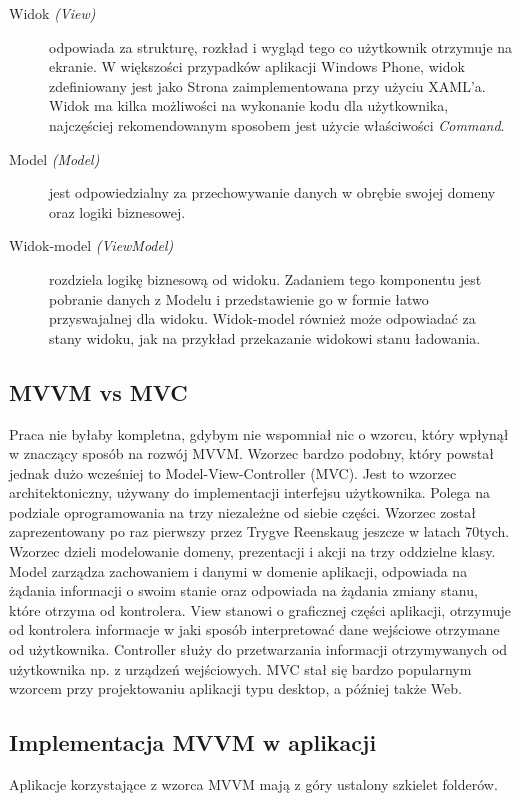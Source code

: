 \documentclass[a4paper,twoside,titlepage,openright]{book}
\begin{document}
\begin{description}

	\item[Widok \textit{(View)}] odpowiada za strukturę, rozkład i wygląd tego co użytkownik otrzymuje na ekranie. W większości przypadków aplikacji Windows Phone, widok zdefiniowany jest jako Strona zaimplementowana przy użyciu XAML’a. Widok ma kilka możliwości na wykonanie kodu dla użytkownika, najczęściej rekomendowanym sposobem jest użycie właściwości \textit{Command}.
	
	\item[Model \textit{(Model)}] jest odpowiedzialny za przechowywanie danych w obrębie swojej domeny oraz logiki biznesowej.
	
	\item[Widok-model \textit{(ViewModel)}] rozdziela logikę biznesową od widoku. Zadaniem tego komponentu jest pobranie danych z Modelu i przedstawienie go w formie łatwo przyswajalnej dla widoku. Widok-model również może odpowiadać za stany widoku, jak na przykład przekazanie widokowi stanu ładowania.

\end{description}


\subsection{MVVM vs MVC}

Praca nie byłaby kompletna, gdybym nie wspomniał nic o wzorcu, który wpłynął w znaczący sposób na rozwój MVVM. Wzorzec bardzo podobny, który powstał jednak dużo wcześniej to Model-View-Controller (MVC). Jest to wzorzec architektoniczny, używany do implementacji interfejsu użytkownika. Polega na podziale oprogramowania na trzy niezależne od siebie części. Wzorzec został zaprezentowany po raz pierwszy przez Trygve Reenskaug jeszcze w latach 70tych. \cite{mvcXerox} Wzorzec dzieli modelowanie domeny, prezentacji i akcji na trzy oddzielne klasy. Model zarządza zachowaniem i danymi w domenie aplikacji, odpowiada na żądania informacji o swoim stanie oraz odpowiada na żądania zmiany stanu, które otrzyma od kontrolera. View stanowi o graficznej części aplikacji, otrzymuje od kontrolera informacje w jaki sposób interpretować dane wejściowe otrzymane od użytkownika. Controller służy do przetwarzania informacji otrzymywanych od użytkownika np. z urządzeń wejściowych. MVC stał się bardzo popularnym wzorcem przy projektowaniu aplikacji typu desktop, a później także Web. 


\subsection{Implementacja MVVM w aplikacji}
Aplikacje korzystające z wzorca MVVM mają z góry ustalony szkielet folderów.
\end{document}
